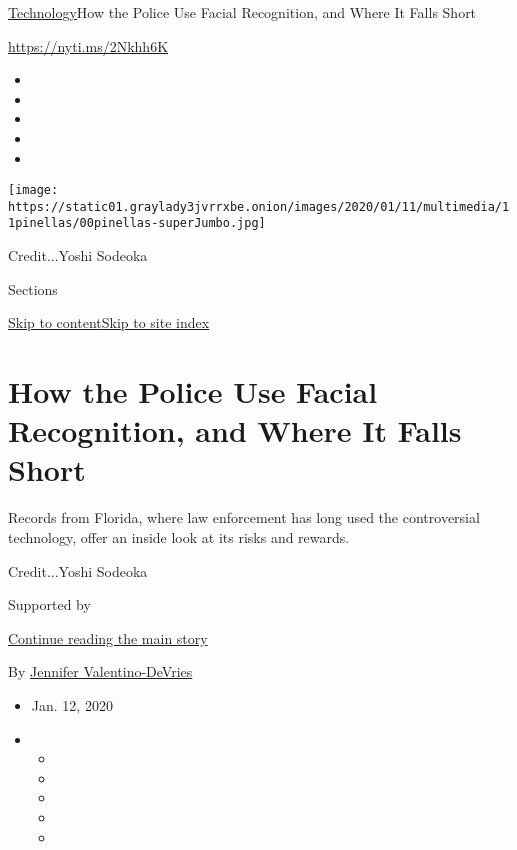\href{/section/technology}{Technology}\textbar{}How the Police Use
Facial Recognition, and Where It Falls Short

\url{https://nyti.ms/2Nkhh6K}

\begin{itemize}
\item
\item
\item
\item
\item
\end{itemize}

\texttt{[image: https://static01.graylady3jvrrxbe.onion/images/2020/01/11/multimedia/11pinellas/00pinellas-superJumbo.jpg]}

Credit...Yoshi Sodeoka

Sections

\protect\hyperlink{site-content}{Skip to
content}\protect\hyperlink{site-index}{Skip to site index}

\hypertarget{how-the-police-use-facial-recognition-and-where-it-falls-short}{%
\section{How the Police Use Facial Recognition, and Where It Falls
Short}\label{how-the-police-use-facial-recognition-and-where-it-falls-short}}

Records from Florida, where law enforcement has long used the
controversial technology, offer an inside look at its risks and rewards.

Credit...Yoshi Sodeoka

Supported by

\protect\hyperlink{after-sponsor}{Continue reading the main story}

By
\href{https://www.nytimes3xbfgragh.onion/by/jennifer-valentino-devries}{Jennifer
Valentino-DeVries}

\begin{itemize}
\item
  Jan. 12, 2020
\item
  \begin{itemize}
  \item
  \item
  \item
  \item
  \item
  \end{itemize}
\end{itemize}


